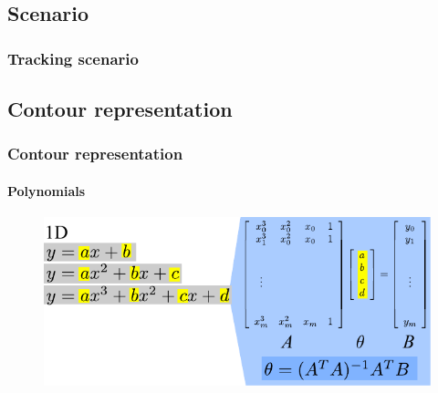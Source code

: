 \subsection{Scenario}

\begin{frame}
\frametitle{Tracking scenario}
\logoCSIPCPL\mypagenum	
\end{frame}






\subsection{Contour representation}

\begin{frame}
\frametitle{Contour representation}
\framesubtitle{Polynomials}
\logoCSIPCPL\mypagenum
	\begin{figure}
		\includegraphics[width=1.0\textwidth]{figs/theory_curves_PolynomialFitting.pdf}
	\end{figure}
\end{frame}


